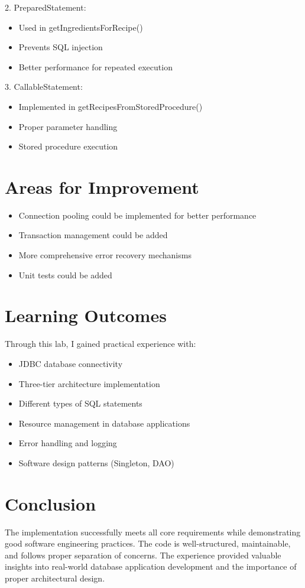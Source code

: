 \documentclass{article}
\begin{document}
2. PreparedStatement:
\begin{itemize}
    \item Used in getIngredientsForRecipe()
    \item Prevents SQL injection
    \item Better performance for repeated execution
\end{itemize}

3. CallableStatement:
\begin{itemize}
    \item Implemented in getRecipesFromStoredProcedure()
    \item Proper parameter handling
    \item Stored procedure execution
\end{itemize}

\section{Areas for Improvement}
\begin{itemize}
    \item Connection pooling could be implemented for better performance
    \item Transaction management could be added
    \item More comprehensive error recovery mechanisms
    \item Unit tests could be added
\end{itemize}

\section{Learning Outcomes}
Through this lab, I gained practical experience with:
\begin{itemize}
    \item JDBC database connectivity
    \item Three-tier architecture implementation
    \item Different types of SQL statements
    \item Resource management in database applications
    \item Error handling and logging
    \item Software design patterns (Singleton, DAO)
\end{itemize}

\section{Conclusion}
The implementation successfully meets all core requirements while demonstrating good software engineering practices. The code is well-structured, maintainable, and follows proper separation of concerns. The experience provided valuable insights into real-world database application development and the importance of proper architectural design.
\end{document}
